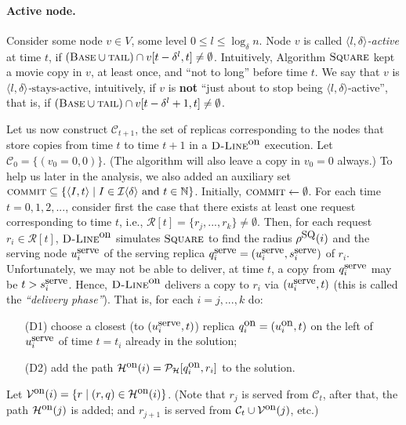 \documentclass[11pt]{article}
\newcommand{\stayactive}[0]{\mbox{stays-active}}
\newcommand{\calV}{\mathcal{V}}
\newcommand{\calH}{\mathcal{H}}
\newcommand{\calI}{\mathcal{I}}
\newcommand{\calR}{\mathcal{R}}
\newcommand{\calP}{\mathcal{P}}
\newcommand{\calC}{\mathcal{C}}
\newcommand{\DBase}[0]{{\mbox{\sc Base}}}
\newcommand{\Square}[0]{\mbox{\sc Square}}
\newcommand{\rr}{r}
\newcommand{\Dlineon}[0]{\mbox{{\sc D-Line}}^{\mbox{\upshape on}}}
\newcommand{\DPHon}[0]{\calH^{\mbox{\upshape\small on}}}
\newcommand{\DPVon}[0]{\calV^{\mbox{\upshape\small on}}}
\newcommand{\Dqon}{{q}^{\mbox{\upshape on}}}
\newcommand{\Duon}{{u}^{\mbox{\upshape on}}}
\newcommand{\qSQ}{q^{\mbox{\small\upshape serve}}}
\newcommand{\uSQ}{u^{\mbox{\small\upshape serve}}}
\newcommand{\sSQ}{s^{\mbox{\small\upshape serve}}}
\newcommand{\tail}[0]{\mbox{\sc tail}}
\newcommand{\DCOMMIT}[0]{\mbox{\sc commit}}
\newcommand{\rhoSQ}[0]{\rho^{\mbox{\small\upshape SQ}}}
\begin{document}
\vspace{-0.3cm}
\paragraph*{\bf Active node\commsingle.\commsingleend}
\label{subsection: def delta active intervals}
Consider some node $v\in V$, some level $0\leq l\leq \log_\delta n$.
Node $v$ is called {\em $\langle l,\delta\rangle$-active} at time $t$,
if
$(\DBase\cup\tail)\cap v[t-\delta^l,t]\not=\emptyset$.
Intuitively,  Algorithm $\Square$
kept a movie copy in $v$, at least once, and ``not to long'' before time $t$.
We say that
$v$ is {\em $\langle l,\delta\rangle$-$\stayactive$}, intuitively, if $v$ is {\bf not} ``just about to stop being $\langle l,\delta\rangle$-active'',
that is, if $(\DBase\cup\tail)\cap v[t-\delta^l+1,t]\not=\emptyset$.






Let us now construct $\calC_{t+1}$, the set of replicas corresponding to the nodes that store copies from time $t$ to time $t+1$ in a $\Dlineon$ execution.
Let $\calC_0=\{(v_0=0,0)\}$.
(The algorithm will also leave a copy in $v_0=0$ always.)
To help us later in the analysis, we also added an auxiliary set
$\DCOMMIT\subseteq\{\langle I,t\rangle\mid I\in \calI\langle\delta\rangle \mbox{ and } t\in\mathbb{N}\}$.
Initially, $\DCOMMIT\leftarrow\emptyset$.
For each time $t=0,1,2,...$, consider first the case that there exists at least one request corresponding to time $t$, i.e., $\calR[t]=\{\rr_{j},...,\rr_k\}\not=\emptyset$.
Then, for each request $\rr_i\in\calR[t]$,
$\Dlineon$ simulates $\Square$ to find the radius $\rhoSQ(i)$ and the serving node $\uSQ_i$ of the serving replica $\qSQ_i=(\uSQ_i,\sSQ_i)$ of $\rr_i$.
Unfortunately, we may not be able to deliver, at time $t$, a copy from $\qSQ_i$ may be $t>\sSQ_i$.
Hence, $\Dlineon$ delivers a copy to $\rr_i$ via $(\uSQ_i,t)$ (this is called the {\em ``delivery phase''}).
That is, for each $i=j,...,k$ do:
\begin{itemize}
\item[(D1)] choose a closest (to $(\uSQ_i,t)$) replica $\Dqon_i=(\Duon_i,t)$
on the left of $\uSQ_i$  of time $t=t_i$ already in the solution;

\item[(D2)] add the path $\DPHon(i)=\calP_\calH[\Dqon_i,\rr_i]$
to the solution.

\end{itemize}
Let $\DPVon(i)=\{\rr \mid (r,q)\in\DPHon(i)\}$.
(Note that $\rr_j$ is served from $\calC_t$, after that, the path $\DPHon(j)$ is added; and $\rr_{j+1}$ is served from $\calC_t\cup\DPVon(j)$, etc.)
\end{document}
